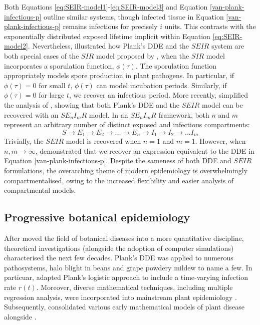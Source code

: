 Both Equations \ref{eq:SEIR-model1}-\ref{eq:SEIR-model3} and Equation \ref{van-plank-infectious-p} outline similar systems,
though infected tissue in Equation \ref{van-plank-infectious-p} remains infectious for precisely $i$ units.
This contrasts with the exponentially distributed exposed lifetime implicit within Equation \ref{eq:SEIR-model2}.
Nevertheless, \cite{segarra2001epidemic} illustrated how Plank's DDE and the $SEIR$ system are both special cases of
the $SIR$ model proposed by \cite{kermack-model}, when the $SIR$ model incorporates a sporulation function, $\phi(\tau)$. 
The sporulation function appropriately models spore production in plant pathogens. 
In particular, if $\phi(\tau) = 0$ for small $t$, $\phi(\tau)$ can model incubation periods. 
Similarly, if $\phi(\tau) = 0$  for large $t$, we recover an infectious period. 
More recently, \cite{time-varying-infectivity} simplified the analysis of \cite{segarra2001epidemic}, showing that 
both Plank's DDE and the $SEIR$ model can be recovered with an $SE_nI_mR$ model.
In an $SE_nI_mR$ framework, both $n$ and $m$ represent an arbitrary number of distinct exposed and infectious compartments:
\[
    S\rightarrow E_1 \rightarrow E_2 \rightarrow ... \rightarrow E_n \rightarrow I_1 \rightarrow I_2 \rightarrow ... I_m
\]
Trivially, the $SEIR$ model is recovered when $n=1$ and $m=1$. However, when $n,m \rightarrow \infty$,
\cite{time-varying-infectivity} demonstrated that we recover an expression equivalent to the DDE in Equation \ref{van-plank-infectious-p}.
Despite the sameness of both DDE and $SEIR$ formulations, the overarching theme of modern epidemiology is overwhelmingly compartmentalised,
owing to the increased flexibility and easier analysis of compartmental models.


\subsection{Progressive botanical epidemiology}
\label{sec:prog-epi}
After \cite{van2013plant} moved the field of botanical diseases into a more quantitative discipline,
theoretical investigations (alongside the adoption of computer simulations) characterised the next few decades.
Plank's DDE was applied to numerous pathosystems, halo blight in beans \cite{doi:10.1111/j.1744-7348.1979.tb06527.x} 
and grape powdery mildew \cite{sall1980epidemiology} to name a few. In particuar, \cite{sall1980epidemiology} adapted Plank's
logistic approach to include a time-varying infection rate $r(t)$. Moreover, diverse mathematical techniques, 
including multiple  regression analysis, were incorporated into mainstream plant epidemiology \cite{butt1974multiple}. 
Subsequently, \cite{zadoks1979epidemiology} consolidated various early mathematical models of plant disease 
alongside \cite{jeger1984use}.

